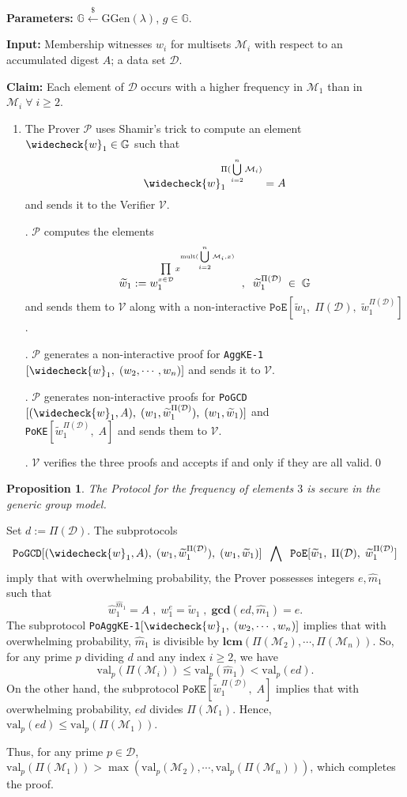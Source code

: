 \documentclass[11pt, lettersize, notitlepage, leqno, footskip=0.6cm]{article}
\newcommand{\pl}{\prod\limits}
\newcommand{\ttt}{\texttt}
\newcommand{\wti}{\widetilde}
\newcommand{\mc}{\mathcal}
\newcommand{\mb}{\mathbb}
\newcommand{\mbf}{\mathbf}
\newcommand{\mr}{\mathrm}
\newcommand{\lamb}{\lambda}
\newcommand{\what}{\widehat}
\newcommand{\weck}{\widecheck}
\newcommand{\mP}{\mc{P}}
\newcommand{\V}{\mc{V}}
\newcommand{\mcM}{\mc{M}}
\newcommand{\vs}{\vspace{-0.15cm}}
\newcommand{\noin}{\noindent}
\newcommand{\op}{overwhelming probability}
\newcommand{\LCM}{\mbf{lcm}}
\newcommand{\GCD}{\mbf{gcd}}
\newtheorem{Prop}[Thm]{Proposition}
\numberwithin{equation}{section}
\begin{document}
\noin \textbf{Parameters:} $\mb{G}\xleftarrow{\$} \mr{GGen}(\lamb)$,\; $g\in \mb{G}$.

\noin \textbf{Input:} Membership witnesses $w_i$ for multisets $\mc{M}_i$ with respect to an accumulated digest $A$; a data set $\mc{D}$.

\noin \textbf{Claim:} Each element of $\mc{D}$ occurs with a higher frequency in $\mc{M}_1$ than in $\mc{M}_i\;\forall\;i\geq 2$. \vs

\begin{enumerate}[wide, labelwidth=!, labelindent=0pt] \vs

\item The Prover $\mP$ uses Shamir's trick to compute an element $\weck{w}_1\in \mb{G}$ such that \vs $$\weck{w}_1 ^{\Pi(\bigcup\limits_{i=2}^n \mc{M}_i)} = A \vs $$ and sends it to the Verifier $\V$. 

\noin 2. $\mP$ computes the elements \vs $$\wti{w}_1:= w_1^{\pl_{x\in\mc{D}} x^{\mr{mult}(\bigcup\limits_{i=2}^n \mc{M}_i, x)}}\;\;,\;\; \wti{w}_1^{\Pi(\mc{D})}\;\in\;\mb{G}\vs $$ and sends them to $\V$ along with a non-interactive $\ttt{PoE}[\wti{w}_1,\;\Pi(\mc{D}),\;\wti{w}_1^{\Pi(\mc{D})}]$. 

\noin 3. $\mP$ generates a non-interactive proof for \verb|AggKE-1|$[\weck{w}_1,\;(w_2,\cdots,w_n)]$ and sends it to $\V$.

\noin 4. $\mP$ generates non-interactive proofs for \verb|PoGCD|$[(\weck{w}_1, A),\;(w_1,\wti{w}_1^{\Pi(\mc{D})}),\;(w_1,\wti{w}_1)]$ and\\ \verb|PoKE|$[\wti{w}_1^{\Pi(\mc{D})},\;A]$ and sends them to $\V$. \vs

\noin 5. $\V$ verifies the three proofs and accepts if and only if they are all valid.\qed\end{enumerate}


\begin{Prop} The Protocol for the frequency of elements $3$ is secure in the generic group model. \end{Prop}

\begin{prf} Set $d:= \Pi(\mc{D})$. The subprotocols \vs $$\ttt{PoGCD}[(\weck{w}_1, A),\;(w_1,\wti{w}_1^{\Pi(\mc{D})}),\;(w_1,\wti{w}_1)]\;\;\bigwedge\;\;\ttt{PoE}[\wti{w}_1,\;\Pi(\mc{D}),\;\wti{w}_1^{\Pi(\mc{D})}] \vs $$ imply that with \op, the Prover possesses integers $e, \what{m}_1$ such that \vs $$\what{w}_1^{\what{m}_1} = A\;,\;w_1^{e} = \wti{w}_1\;,\; \GCD(ed, \what{m}_1)  = e .$$ The subprotocol \verb|PoAggKE-1|$[\weck{w}_1,\;(w_2,\cdots,w_n)]$ implies that with \op, $\what{m}_1$ is divisible by $\LCM(\Pi(\mcM_2),\cdots,\Pi(\mcM_n))$. So, for any prime $p$ dividing $d$ and any index $i\geq 2$, we have \vs $$\mr{val}_p(\Pi(\mcM_i)) \leq \mr{val}_p(\what{m}_1) < \mr{val}_p(ed).$$ On the other hand, the subprotocol $\ttt{PoKE}[\wti{w}_1^{\Pi(\mc{D})},\;A]$ implies that with \op, $ed$ divides $\Pi(\mcM_1)$. Hence, $\mr{val}_p(ed)\leq \mr{val}_p(\Pi(\mcM_1))$.

Thus, for any prime $p \in \mc{D}$, $\mr{val}_p(\Pi(\mcM_1))> \max(\mr{val}_p(\mcM_2),\cdots, \mr{val}_p(\Pi(\mcM_n)))$, which completes the proof.\end{prf}
\end{document}
